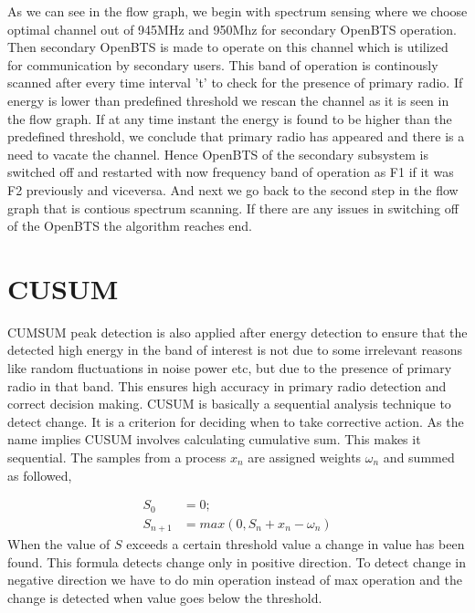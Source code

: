 As we can see in the flow graph, we begin with spectrum sensing where we choose optimal channel out of 945MHz and 950Mhz for secondary OpenBTS operation.
Then secondary OpenBTS is made to operate on this channel which is utilized for communication by secondary users. 
This band of operation is continously scanned after every time interval 't' to check for the presence of primary radio. If energy is lower than predefined threshold we rescan the channel as it is seen in the flow graph.
If at any time instant the energy is found to be higher than the predefined threshold,
 we conclude that primary radio has appeared and there is a need to vacate the channel. Hence  OpenBTS of the secondary subsystem is switched off and 
restarted with now frequency band of operation as F1 if it was F2 previously and viceversa. And next we go back to the second step in the flow graph that is contious spectrum scanning. 
If there are any issues in switching off of the OpenBTS the algorithm reaches end.





\section{CUSUM}
CUMSUM peak detection is also applied after energy detection to ensure that the
detected high energy in the band of interest is not due to some irrelevant 
reasons like random fluctuations in noise power etc, but due to the presence of 
primary radio in that band. This ensures high accuracy in primary radio 
detection and correct decision making.
CUSUM is basically a sequential analysis technique to detect change. 
It is a criterion for deciding when to take corrective action. As the name 
implies CUSUM involves calculating cumulative sum. This makes it sequential. 
The samples from a process $x_n$  are assigned weights $\omega_n$  and summed 
as followed,

\begin{align}
S_0 &= 0; \nonumber \\
S_{n+1} &= max(0, S_n + x_n - \omega_n) \nonumber
\end{align}
When the value of $S$ exceeds a certain threshold value a change in value has 
been found. This formula detects change only in positive direction. To detect 
change in negative direction we have to do min operation instead of max 
operation and the change  is detected when value goes below the threshold.

